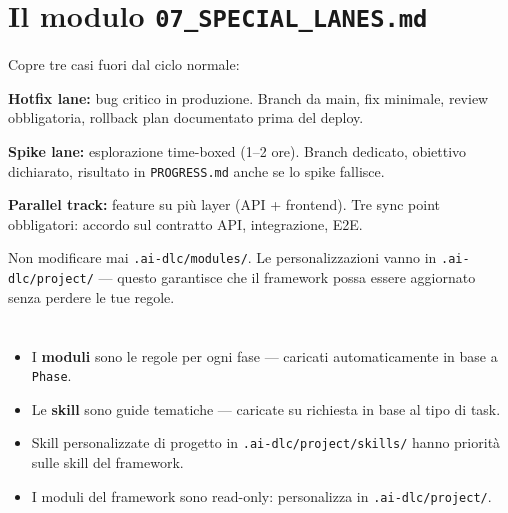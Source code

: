 \section{Il modulo \texttt{07\_SPECIAL\_LANES.md}}
\label{sec:12-special-lanes}

Copre tre casi fuori dal ciclo normale:

\textbf{Hotfix lane:} bug critico in produzione. Branch da main, fix minimale, review obbligatoria, rollback plan documentato prima del deploy.

\textbf{Spike lane:} esplorazione time-boxed (1--2 ore). Branch dedicato, obiettivo dichiarato, risultato in \texttt{PROGRESS.md} anche se lo spike fallisce.

\textbf{Parallel track:} feature su più layer (API + frontend). Tre sync point obbligatori: accordo sul contratto API, integrazione, E2E.

\begin{warnbox}
Non modificare mai \texttt{.ai-dlc/modules/}. Le personalizzazioni vanno in \texttt{.ai-dlc/project/} --- questo garantisce che il framework possa essere aggiornato senza perdere le tue regole.
\end{warnbox}

\section*{\LabelSummary}

\begin{itemize}
  \item I \textbf{moduli} sono le regole per ogni fase --- caricati automaticamente in base a \texttt{Phase}.
  \item Le \textbf{skill} sono guide tematiche --- caricate su richiesta in base al tipo di task.
  \item Skill personalizzate di progetto in \texttt{.ai-dlc/project/skills/} hanno priorità sulle skill del framework.
  \item I moduli del framework sono read-only: personalizza in \texttt{.ai-dlc/project/}.
\end{itemize}
